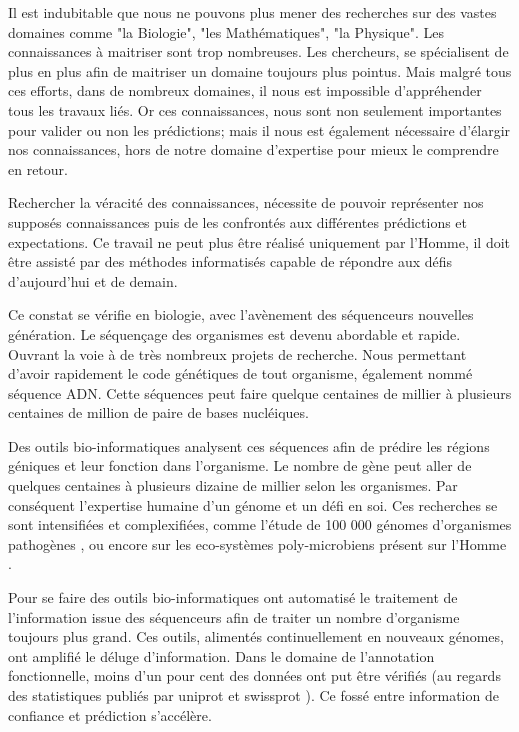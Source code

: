 Il est indubitable que  nous ne pouvons plus mener des recherches sur des vastes domaines comme "la Biologie", "les Mathématiques", "la Physique". Les connaissances à maitriser sont trop nombreuses. Les chercheurs, se spécialisent de plus en plus afin de maitriser un domaine toujours plus pointus. Mais malgré tous ces efforts, dans de nombreux domaines, il nous est impossible d'appréhender tous les travaux liés. Or ces connaissances, nous sont non seulement
importantes pour valider ou non les prédictions; mais il nous est également nécessaire d'élargir nos connaissances, hors de notre domaine d'expertise pour mieux le comprendre en retour.

Rechercher la véracité des connaissances, nécessite de pouvoir représenter nos supposés connaissances puis de les confrontés aux différentes prédictions et expectations. Ce travail ne peut plus être réalisé uniquement par l'Homme, il doit être assisté par des méthodes informatisés capable de répondre aux défis d'aujourd'hui et de demain.

Ce constat se vérifie en biologie, avec l'avènement des séquenceurs nouvelles génération. Le séquençage des organismes est devenu abordable et rapide. Ouvrant la voie à de très nombreux projets de recherche. Nous permettant d'avoir rapidement le code génétiques de tout organisme, également nommé séquence \gls{ADN}. Cette séquences peut faire quelque centaines de millier à plusieurs centaines de million de paire de bases nucléiques.

Des outils bio-informatiques analysent ces séquences afin de prédire les régions géniques et leur fonction dans l'organisme. Le nombre de gène peut aller de quelques centaines à plusieurs dizaine de millier selon les organismes. Par conséquent l'expertise humaine d'un génome et un défi en soi. Ces recherches se sont intensifiées et complexifiées, comme l'étude de 100 000 génomes d'organismes pathogènes \citep[voir][]{100kfoodborne}, ou encore sur les eco-systèmes poly-microbiens présent sur l'Homme \citep[voir][]{hmp}.

Pour se faire des outils bio-informatiques ont automatisé le traitement de l'information issue des séquenceurs afin de traiter un nombre d'organisme toujours plus grand. Ces outils, alimentés continuellement en nouveaux génomes, ont amplifié le déluge d'information. Dans le domaine de l'annotation fonctionnelle, moins d'un pour cent des données ont put être vérifiés (au regards des statistiques publiés par uniprot et swissprot \parencites{uniprot_stat}{expasy_stat} ). Ce fossé entre information de confiance et prédiction s'accélère.

